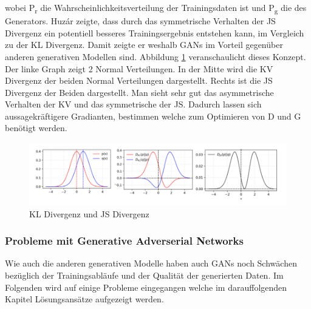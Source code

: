 \documentclass{llncs}
\begin{document}
wobei P\textsubscript{r} die Wahrscheinlichkeitsverteilung der Trainingsdaten ist und P\textsubscript{g} die des Generators. Huzár \cite{sha} zeigte, dass durch das symmetrische Verhalten der JS Divergenz ein potentiell besseres Trainingsergebnis entstehen kann, im Vergleich zu der KL Divergenz. Damit zeigte er weshalb GANs im Vorteil gegenüber anderen generativen Modellen sind. Abbildung \ref{fig:Bild7} veranschaulicht dieses Konzept. Der linke Graph zeigt 2 Normal Verteilungen. In der Mitte wird die KV Divergenz der beiden Normal Verteilungen dargestellt.  Rechts ist die JS Divergenz der Beiden dargestellt. Man sieht sehr gut das asymmetrische Verhalten der KV und das symmetrische der JS. Dadurch lassen sich aussagekräftigere Gradianten, bestimmen welche zum Optimieren von D und G benötigt werden\cite{sha}. 
 
\begin{figure}
	\centering
	\includegraphics[width=1.0\linewidth]{KLdiv}
	\caption{KL Divergenz und JS Divergenz}
	\label{fig:Bild7}
\end{figure}

\subsubsection{Probleme mit Generative Adverserial Networks}

Wie auch die anderen generativen Modelle haben auch  GANs noch Schwächen bezüglich der Trainingsabläufe und der Qualität der generierten Daten. Im Folgenden wird auf einige Probleme eingegangen welche im darauffolgenden Kapitel Lösungsansätze aufgezeigt werden. 
\end{document}
